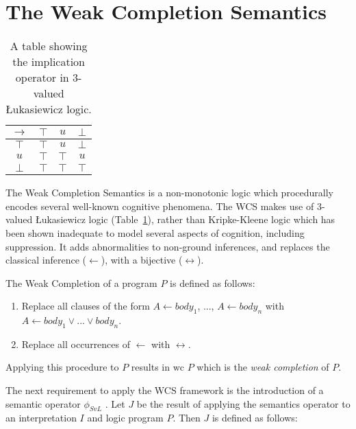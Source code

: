\section{The Weak Completion Semantics} \label{ssec:wcs}
\begin{table}
\begin{center}
\begin{tabular}{ c | c c c }
  $\rightarrow$& $\top$ & $u$ & $\bot$ \\ \hline
 $\top$ & $\top$ & $u$ & $\bot$ \\  
 $u$ & $\top$ & $\top$ & $u$\\  
 $\bot$ & $\top$ & $\top$ & $\top$
\end{tabular}
\caption{A table showing the implication operator in 3-valued \L ukasiewicz logic.}
\label{tbl:luk}
\end{center}
\end{table}

The Weak Completion Semantics is a non-monotonic logic which procedurally encodes several well-known cognitive phenomena. The WCS makes use of 3-valued \L ukasiewicz logic (Table~\ref{tbl:luk}), rather than Kripke-Kleene logic which has been shown inadequate to model several aspects of cognition, including suppression\citep{dietz2012computational}. It adds abnormalities to non-ground inferences, and replaces the classical inference ($\leftarrow$), with a bijective ($\leftrightarrow$). 

The Weak Completion of a program $P$ is defined as follows:

\begin{enumerate}
\item Replace all clauses of the form $A \leftarrow body_1$, ..., $A \leftarrow body_n$ with $A \leftarrow body_1 \lor ... \lor body_n$.
\item Replace all occurrences of $\leftarrow$ with $\leftrightarrow$.
\end{enumerate}

Applying this procedure to $P$ results in $\text{wc }P$ which is the \textit{weak completion} of $P$.

The next requirement to apply the WCS framework is the introduction of a semantic operator $\phi_{SvL}$ \citep{stenning2008interpretation}. Let $J$ be the result of applying the semantics operator to an interpretation $I$ and logic program $P$. Then $J$ is defined as follows:

